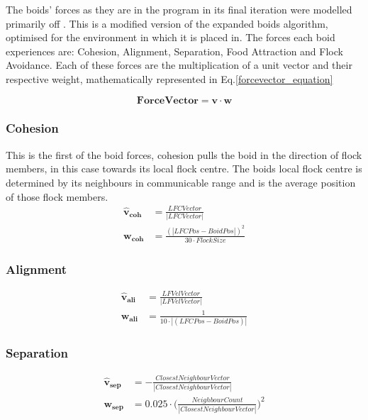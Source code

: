 The boids' forces as they are in the program in its final iteration were modelled primarily off \citet{4604156}. This is a modified version of the expanded boids algorithm, optimised for the environment in which it is placed in. The forces each boid experiences are: Cohesion, Alignment, Separation, Food Attraction and Flock Avoidance. Each of these forces are the multiplication of a unit vector and their respective weight, mathematically represented in Eq.\ref{forcevector_equation}

\begin{equation}
\boldsymbol{Force Vector} = \boldsymbol{v} \cdot \boldsymbol{w}
\label{forcevector_equation}
\end{equation}

\subsubsection{Cohesion} 
This is the first of the boid forces, cohesion pulls the boid in the direction of flock members, in this case towards its local flock centre. The boids local flock centre is determined by its neighbours in communicable range and is the average position of those flock members. 
\begin{equation}
\begin{split}
	\boldsymbol{\hat{v}_{coh}} &= \frac{ LFCVector} {|LFCVector|} \\
	\boldsymbol{w_{coh}} &= \frac{(|LFCPos - BoidPos|)^2} {30 \cdot FlockSize}
\end{split}
\label{cohesion_equation}
\end{equation}

\subsubsection{Alignment}
\begin{equation}
\begin{split}
	\boldsymbol{\hat{v}_{ali}} &= \frac{ LFVelVector} {|LFVelVector|} \\
	\boldsymbol{w_{ali}} &= \frac{1} {10 \cdot |(LFCPos - BoidPos)|}
\end{split}
\label{alignment_equation}
\end{equation}

\subsubsection{Separation}
\begin{equation}
\begin{split}
	\boldsymbol{\hat{v}_{sep}} &= -\frac{ClosestNeighbourVector} {| ClosestNeighbourVector|} \\
	\boldsymbol{w_{sep}} &= 0.025 \cdot  \Big(\frac{NeighbourCount} {|ClosestNeighbourVector|}\Big)^2
\end{split}
\label{separation_equation}
\end{equation}

